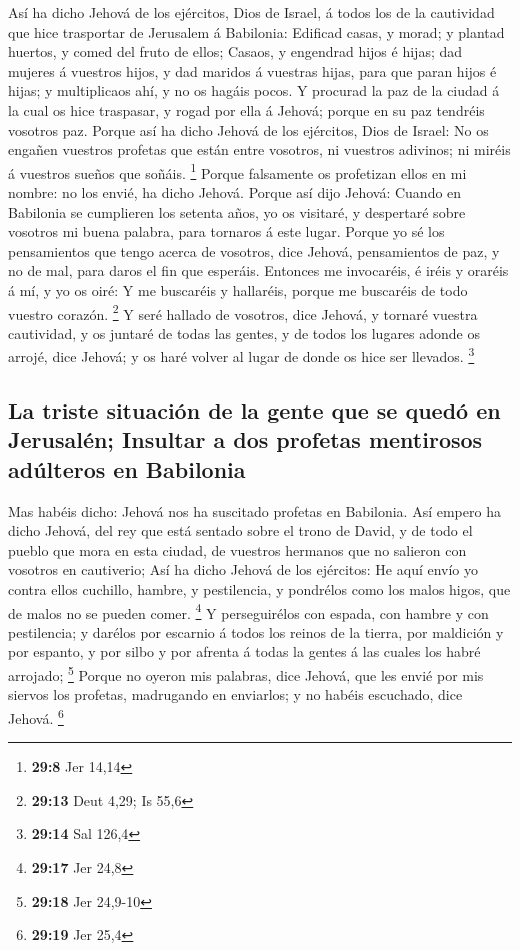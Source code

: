  Así ha dicho Jehová de los ejércitos, Dios de Israel, á
todos los de la cautividad que hice trasportar de Jerusalem á Babilonia:
 Edificad casas, y morad; y plantad huertos, y comed del
fruto de ellos;  Casaos, y engendrad hijos é hijas; dad
mujeres á vuestros hijos, y dad maridos á vuestras hijas, para que paran
hijos é hijas; y multiplicaos ahí, y no os hagáis pocos.  Y
procurad la paz de la ciudad á la cual os hice traspasar, y rogad por
ella á Jehová; porque en su paz tendréis vosotros paz. 
Porque así ha dicho Jehová de los ejércitos, Dios de Israel: No os
engañen vuestros profetas que están entre vosotros, ni vuestros
adivinos; ni miréis á vuestros sueños que soñáis. \footnote{\textbf{29:8}
  Jer 14,14}  Porque falsamente os profetizan ellos en mi
nombre: no los envié, ha dicho Jehová.  Porque así dijo
Jehová: Cuando en Babilonia se cumplieren los setenta años, yo os
visitaré, y despertaré sobre vosotros mi buena palabra, para tornaros á
este lugar.  Porque yo sé los pensamientos que tengo acerca
de vosotros, dice Jehová, pensamientos de paz, y no de mal, para daros
el fin que esperáis.  Entonces me invocaréis, é iréis y
oraréis á mí, y yo os oiré:  Y me buscaréis y hallaréis,
porque me buscaréis de todo vuestro corazón. \footnote{\textbf{29:13}
  Deut 4,29; Is 55,6}  Y seré hallado de vosotros, dice
Jehová, y tornaré vuestra cautividad, y os juntaré de todas las gentes,
y de todos los lugares adonde os arrojé, dice Jehová; y os haré volver
al lugar de donde os hice ser llevados. \footnote{\textbf{29:14} Sal
  126,4}

\hypertarget{la-triste-situaciuxf3n-de-la-gente-que-se-queduxf3-en-jerusaluxe9n-insultar-a-dos-profetas-mentirosos-aduxfalteros-en-babilonia}{%
\subsection{La triste situación de la gente que se quedó en Jerusalén;
Insultar a dos profetas mentirosos adúlteros en
Babilonia}\label{la-triste-situaciuxf3n-de-la-gente-que-se-queduxf3-en-jerusaluxe9n-insultar-a-dos-profetas-mentirosos-aduxfalteros-en-babilonia}}

 Mas habéis dicho: Jehová nos ha suscitado profetas en
Babilonia.  Así empero ha dicho Jehová, del rey que está
sentado sobre el trono de David, y de todo el pueblo que mora en esta
ciudad, de vuestros hermanos que no salieron con vosotros en cautiverio;
 Así ha dicho Jehová de los ejércitos: He aquí envío yo
contra ellos cuchillo, hambre, y pestilencia, y pondrélos como los malos
higos, que de malos no se pueden comer. \footnote{\textbf{29:17} Jer
  24,8}  Y perseguirélos con espada, con hambre y con
pestilencia; y darélos por escarnio á todos los reinos de la tierra, por
maldición y por espanto, y por silbo y por afrenta á todas la gentes á
las cuales los habré arrojado; \footnote{\textbf{29:18} Jer 24,9-10}
 Porque no oyeron mis palabras, dice Jehová, que les envié
por mis siervos los profetas, madrugando en enviarlos; y no habéis
escuchado, dice Jehová. \footnote{\textbf{29:19} Jer 25,4}

